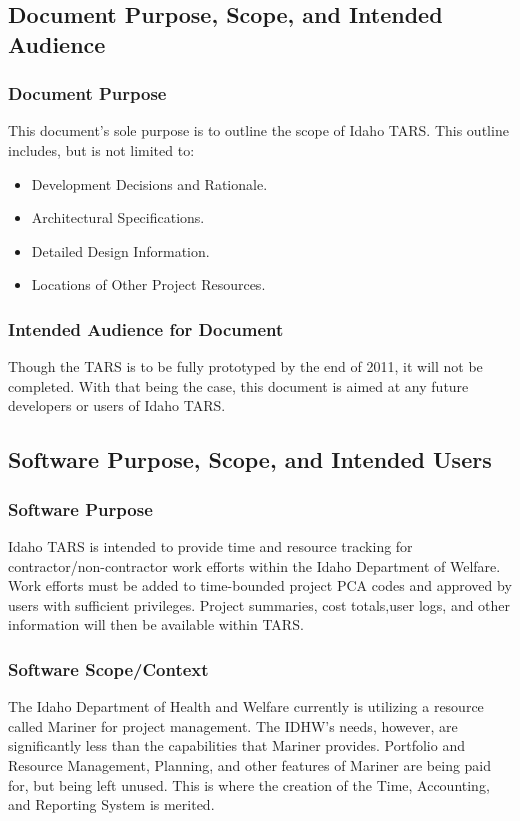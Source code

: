 \documentclass[letterpaper]{article}
\begin{document}
\subsection{\bfseries{Document Purpose, Scope, and Intended Audience}}
\subsubsection{Document Purpose}
This document's sole purpose is to outline the scope of Idaho TARS. This outline includes, but is not limited to:
\begin{itemize}
\item Development Decisions and Rationale.
\item Architectural Specifications.
\item Detailed Design Information.
\item Locations of Other Project Resources.
\end{itemize}
\subsubsection{Intended Audience for Document}
Though the TARS is to be fully prototyped by the end of 2011, it will not be completed. With that being the case, this document is aimed at any future developers or users of Idaho TARS. 

\subsection{\bfseries{Software Purpose, Scope, and Intended Users}}
\subsubsection{Software Purpose}
Idaho TARS is intended to provide time and resource tracking for contractor/non-contractor work efforts within the Idaho Department of Welfare. Work efforts must be added to time-bounded project PCA codes and approved by users with sufficient privileges. Project summaries, cost totals,user logs, and other information will then be available within TARS.     

\subsubsection{Software Scope/Context}
The Idaho Department of Health and Welfare currently is utilizing a resource called Mariner for project management. The IDHW's needs, however, are significantly less than the capabilities that Mariner provides. Portfolio and Resource Management, Planning, and other features of Mariner are being paid for, but being left unused. This is where the creation of the Time, Accounting, and Reporting System is merited. 
\end{document}
